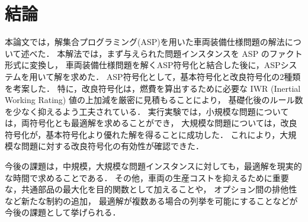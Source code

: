 \chapter{結論}
本論文では，解集合プログラミング(ASP)を用いた車両装備仕様問題の解法について述べた．
本解法では，まず与えられた問題インスタンスを ASP のファクト形式に変換し，
車両装備仕様問題を解くASP符号化と結合した後に，ASPシステムを用いて解を求めた．
ASP符号化として，基本符号化と改良符号化の2種類を考案した．
特に，改良符号化は，燃費を算出するために必要な
IWR (Inertial Working Rating) 値の上加減を厳密に見積もることにより，
基礎化後のルール数を少なく抑えるよう工夫されている．
実行実験では，小規模な問題については，両符号化とも最適解を求めることができ，
大規模な問題については，改良符号化が，基本符号化より優れた解を得ることに成功した．
これにより，大規模な問題に対する改良符号化の有効性が確認できた．

今後の課題は，中規模，大規模な問題インスタンスに対しても，最適解を現実的な時間で求めることである．
その他，車両の生産コストを抑えるために重要な，共通部品の最大化を目的関数として加えることや，
オプション間の排他性など新たな制約の追加，
最適解が複数ある場合の列挙を可能にすることなどが今後の課題として挙げられる．
